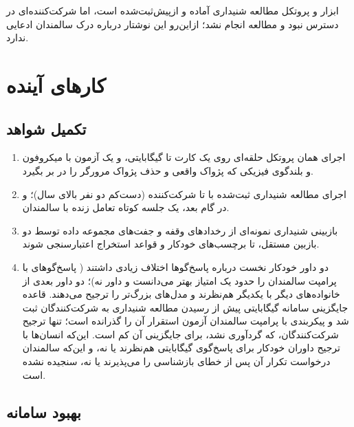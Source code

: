  ابزار و پروتکل مطالعه شنیداری آماده و
ازپیش‌ثبت‌شده است، اما شرکت‌کننده‌ای در دسترس نبود و مطالعه انجام نشد؛ ازاین‌رو
این نوشتار درباره درک سالمندان ادعایی ندارد.

\section{کارهای آینده}
\label{sec:future}

\subsection{تکمیل شواهد}

\begin{enumerate}
\item {} اجرای همان پروتکل حلقه‌ای روی یک
      کارت  تا  گیگابایتی، و یک آزمون با میکروفون و بلندگوی
      فیزیکی که پژواک واقعی و حذف پژواک مرورگر را در بر بگیرد.
\item {} اجرای مطالعه شنیداری ثبت‌شده با  تا 
      شرکت‌کننده (دست‌کم دو نفر بالای  سال)؛ و در گام بعد، یک جلسه کوتاه
      تعامل زنده با سالمندان.
\item {} بازبینی شنیداری نمونه‌ای از رخدادهای وقفه و
      جفت‌های مجموعه داده توسط دو بازبین مستقل، تا برچسب‌های خودکار
       و قواعد استخراج اعتبارسنجی شوند.
\item {} دو داور خودکار نخست درباره پاسخ‌گوها اختلاف
      زیادی داشتند ( پاسخ‌گوهای با پرامپت سالمندان را حدود یک امتیاز
      بهتر می‌دانست و داور  نه)؛ دو داور بعدی از خانواده‌های دیگر با
      یکدیگر هم‌نظرند و مدل‌های بزرگ‌تر  را ترجیح می‌دهند. قاعده
      جایگزینی سامانه  گیگابایتی پیش از رسیدن مطالعه شنیداری به شرکت‌کنندگان ثبت شد و
      پیکربندی  با پرامپت سالمندان آزمون استقرار آن را گذرانده
      است؛ تنها ترجیح شرکت‌کنندگان، که گردآوری نشد، برای جایگزینی آن کم است. این‌که انسان‌ها
      با ترجیح داوران خودکار برای پاسخ‌گوی  گیگابایتی هم‌نظرند یا نه، و
      این‌که سالمندان درخواست تکرار آن پس از خطای بازشناسی را می‌پذیرند یا نه،
      سنجیده نشده است.
\end{enumerate}

\subsection{بهبود سامانه}

